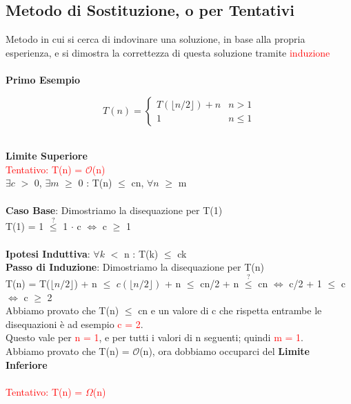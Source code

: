 \documentclass[../cheatSheetAlgoritmi.tex]{subfiles}
\begin{document}
\subsection{Metodo di Sostituzione, o per Tentativi}
Metodo in cui si cerca di indovinare una soluzione, in base alla propria esperienza, e si dimostra la correttezza di questa soluzione tramite \textcolor{red}{induzione}\\\\
\textbf{Primo Esempio}
\begin{center}
	\begin{equation*}
  		T(n)=\begin{cases}
    		T(\lfloor n/2 \rfloor) + n & \text{$n > 1$}\\
    		1 & \text{$n \leq 1$}
  		\end{cases}
	\end{equation*}
\end{center}
\hfill\\
\textbf{Limite Superiore}\\
\textcolor{red}{Tentativo: T(n) = $\mathcal{O}$(n)}\\
$\exists c$ $>$ 0, $\exists m$ $\geq$ 0 : T(n) $\leq$ cn, $\forall n$ $\geq$ m\\\\
\textbf{Caso Base}: Dimostriamo la disequazione per T(1)\\
T(1) = 1 $\stackrel{?}{\leq}$ 1 $\cdot$ c $\iff$ c $\geq$ 1\\\\
\textbf{Ipotesi Induttiva}: $\forall k$ $<$ n : T(k) $\leq$ ck\\
\textbf{Passo di Induzione}: Dimostriamo la disequazione per T(n)\\
T(n) =  T($\lfloor n/2 \rfloor$) + n $\leq$ $c( \lfloor n/2 \rfloor)$ + n $\leq$ cn/2 + n $\stackrel{?}{\leq}$ cn $\iff$  c/2 + 1 $\leq$ c\\
$\iff$ c $\geq$ 2\\
Abbiamo provato che T(n) $\leq$ cn e un valore di c che rispetta entrambe le disequazioni è ad esempio \textcolor{red}{c = 2}.\\
Questo vale per \textcolor{red}{n = 1}, e per tutti i valori di n seguenti; quindi \textcolor{red}{m = 1}.\\
Abbiamo provato che T(n) = $\mathcal{O}$(n), ora dobbiamo occuparci del \textbf{Limite Inferiore}\\\\
\textcolor{red}{Tentativo: T(n) = $\Omega$(n)}\\
\end{document}
